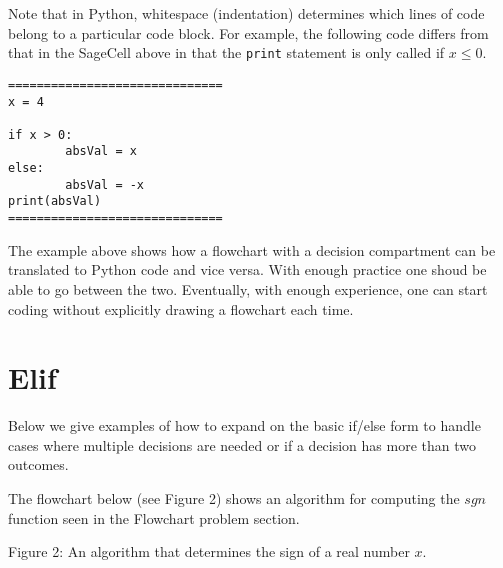 \documentclass{ximera}
\begin{document}
Note that in Python, whitespace (indentation) determines which lines of code belong to a particular code block. For example, the following code differs from that in the SageCell above in that the \verb|print| statement is only called if $x\leq 0$.

\begin{verbatim}
==============================
x = 4

if x > 0:
        absVal = x
else:
        absVal = -x
print(absVal)
==============================
\end{verbatim}

The example above shows how a flowchart with a decision compartment can be translated to Python code and vice versa. With enough practice one shoud be able to go between the two. Eventually, with enough experience, one can start coding without explicitly drawing a flowchart each time.

\section{Elif}

Below we give examples of how to expand on the basic if/else form to handle cases where multiple decisions are needed or if a decision has more than two outcomes.

The flowchart below (see Figure 2) shows an algorithm for computing the $sgn$ function seen in the Flowchart problem section.

\begin{center}
\end{center}
\begin{center}
    Figure 2: An algorithm that determines the sign of a real number $x$.
\end{center}
\end{document}
